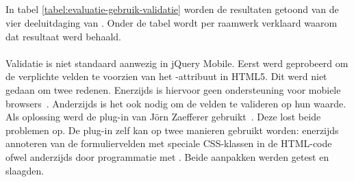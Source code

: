 
\subsection{}
\label{sec:evaluatie-gebruik-validatie}

In tabel \ref{tabel:evaluatie-gebruik-validatie} worden de resultaten getoond van de vier deeluitdaging van .
Onder de tabel wordt per raamwerk verklaard waarom dat resultaat werd behaald.


\begin{table}[H]
\centering
{}
\caption{Gebruik voor }
\label{tabel:evaluatie-gebruik-validatie}
\end{table}

\paragraph{\jqm}
Validatie is niet standaard aanwezig in jQuery Mobile. 
Eerst werd geprobeerd om de verplichte velden te voorzien van het -attribuut in HTML5. 
Dit werd niet gedaan om twee redenen.
Enerzijds is hiervoor geen ondersteuning voor mobiele browsers~\cite{Deveria2013}. 
Anderzijds is het ook nodig om de velden te valideren op hun waarde.
Als oplossing werd de plug-in van Jörn Zaefferer gebruikt~\cite{Zaefferer2013}. 
Deze lost beide problemen op.
De plug-in zelf kan op twee manieren gebruikt worden: enerzijds annoteren van de formuliervelden met speciale CSS-klassen in de HTML-code ofwel anderzijds door programmatie met \js{}. 
Beide aanpakken werden getest en slaagden. 

